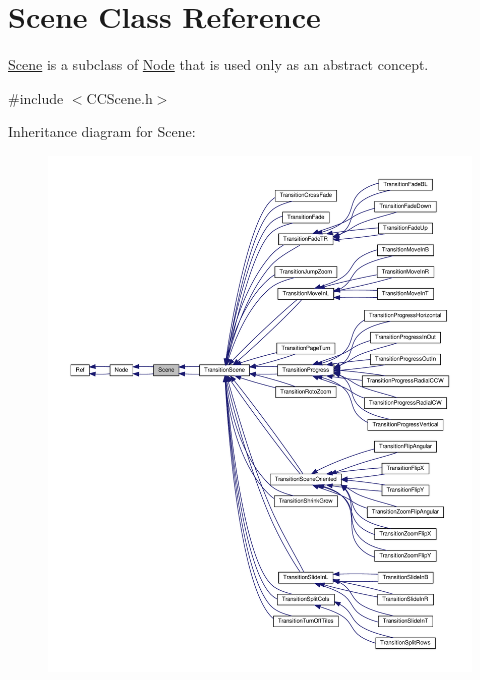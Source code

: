 \hypertarget{classScene}{}\section{Scene Class Reference}
\label{classScene}


\hyperlink{classScene}{Scene} is a subclass of \hyperlink{classNode}{Node} that is used only as an abstract concept.  




{\ttfamily \#include $<$C\+C\+Scene.\+h$>$}



Inheritance diagram for Scene\+:
\nopagebreak
\begin{figure}[H]
\begin{center}
\leavevmode
\includegraphics[width=350pt]{classScene__inherit__graph}
\end{center}
\end{figure}


